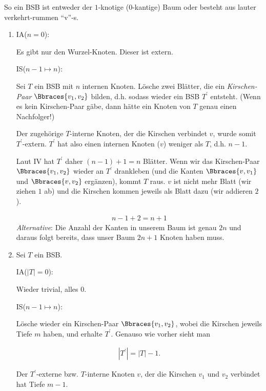 \begin{solution}

So ein BSB ist entweder der $1$-knotige ($0$-kantige) Baum oder besteht aus lauter verkehrt-rummen \enquote{v}-s.

\begin{enumerate}[label = \alph*)]

    \item IA($n = 0$):

    Es gibt nur den Wurzel-Knoten.
    Dieser ist extern.

    IS($n-1 \mapsto n$):

    Sei $T$ ein BSB mit $n$ internen Knoten.
    Lösche zwei Blätter, die ein \textit{Kirschen-Paar} $\Bbraces{v_1, v_2}$ bilden, d.h. sodass wieder ein BSB $T^\prime$ entsteht.
    (Wenn es kein Kirschen-Paar gäbe, dann hätte ein Knoten von $T$ genau einen Nachfolger!)

    Der zugehörige $T$-interne Knoten, der die Kirschen verbindet $v$, wurde somit $T^\prime$-extern.
    $T^\prime$ hat also einen internen Knoten ($v$) weniger als $T$, d.h. $n - 1$.

    Laut IV hat $T^\prime$ daher $(n - 1) + 1 = n$ Blätter.
    Wenn wir das Kirschen-Paar $\Bbraces{v_1, v_2}$ wieder an $T^\prime$ drankleben (und die Kanten $\Bbraces{v, v_1}$ und $\Bbraces{v, v_2}$ ergänzen), kommt $T$ raus.
    $v$ ist nicht mehr Blatt (wir ziehen $1$ ab) und die Kirschen kommen jeweils als Blatt dazu (wir addieren $2$).

    \begin{align*}
        n - 1 + 2 = n + 1
    \end{align*}
    \textit{Alternative}:
    Die Anzahl der Kanten in unserem Baum ist genau $2n$ und daraus folgt bereits,
    dass unser Baum $2n + 1$ Knoten haben muss.
    \item Sei $T$ ein BSB.

    IA($|T| = 0$):

    Wieder trivial, alles $0$.

    IS($n-1 \mapsto n$):

    Lösche wieder ein Kirschen-Paar $\Bbraces{v_1, v_2}$, wobei die Kirschen jeweils Tiefe $m$ haben, und erhalte $T^\prime$.
    Genauso wie vorher sieht man

    \begin{align*}
        |T^\prime| = |T| - 1.
    \end{align*}

    Der $T^\prime$-externe bzw. $T$-interne Knoten $v$, der die Kirschen $v_1$ und $v_2$ verbindet hat Tiefe $m - 1$.


\end{enumerate}
\end{solution}
